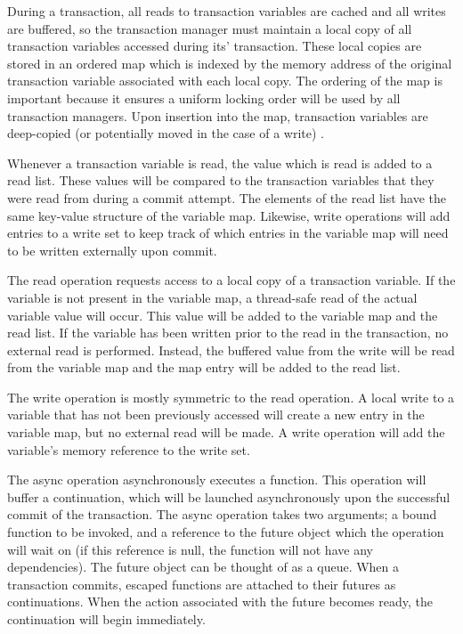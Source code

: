 \documentclass[conference]{IEEEtran}
\begin{document}
During a transaction, all reads to transaction variables are cached and all writes are buffered, so the transaction manager must maintain a local copy of all transaction variables accessed during its' transaction. These local copies are stored in an ordered map which is indexed by the memory address
of the original transaction variable associated with each local copy. The ordering of the map is important because it ensures a uniform locking order will be used by all transaction managers. Upon insertion into
the map, transaction variables are deep-copied (or potentially moved in the case of a write) .

Whenever a transaction variable is read, the value which is read is added to a read list. These values will be compared to the transaction variables that they were read from during a commit attempt. The elements
of the read list have the same key-value structure of the variable map. Likewise, write operations will add entries to a write set to keep track
of which entries in the variable map will need to be written externally upon
commit.

The read operation requests access to a local copy of a transaction
variable. If the variable is not present in the variable map, a
thread-safe read of the actual variable value will occur. This value will be
added to the variable map and the read list. If the variable has been written
prior to the read in the transaction, no external read is performed. Instead,
the buffered value from the write will be read from the variable map
and the map entry will be added to the read list.

The write operation is mostly symmetric to the read operation. A local write to
a variable that has not been previously accessed will create a new entry in the
variable map, but no external read will be made. A write operation will add the
variable's memory reference to the write set.

The async operation asynchronously executes a function. This operation will
buffer a continuation, which will be launched asynchronously upon the
successful commit of the transaction. The async operation takes two
arguments; a bound function to be invoked, and a reference to the future
object which the operation will wait on (if this reference is null, the function will not have any dependencies). The future object can be
thought of as a queue. When a transaction commits, escaped functions are
attached to their futures as continuations. When the action associated with the
future becomes ready, the continuation will begin immediately.
\end{document}
